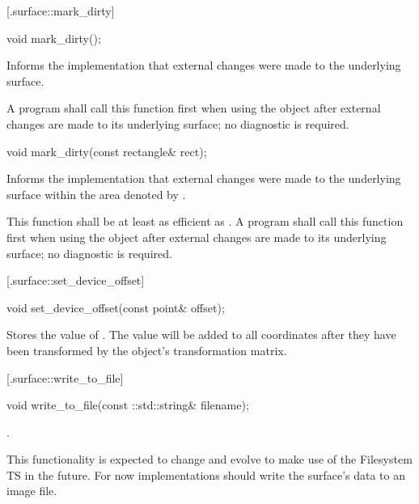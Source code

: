  [\iotwod.surface::mark_dirty] {}

%
%
\begin{itemdecl}
void mark_dirty();
\end{itemdecl}
\begin{itemdescr}
	\pnum
	\effects
	Informs the implementation that external changes were made to the underlying surface.
	
	\pnum
	\remarks
	A program shall call this function first when using the  object after external changes are made to its underlying surface; no diagnostic is required.
\end{itemdescr}

\begin{itemdecl}
void mark_dirty(const rectangle& rect);
\end{itemdecl}
\begin{itemdescr}
	\pnum
	\effects
	Informs the implementation that external changes were made to the underlying surface within the area denoted by .
	
	\pnum
	\remarks
	This function shall be at least as efficient as . A program shall call this function first when using the  object after external changes are made to its underlying surface; no diagnostic is required.
\end{itemdescr}

 [\iotwod.surface::set_device_offset] {}

%
%
\begin{itemdecl}
void set_device_offset(const point& offset);
\end{itemdecl}
\begin{itemdescr}
	\pnum
	\effects
	Stores the value of . The value will be added to all coordinates after they have been transformed by the  object's transformation matrix.
\end{itemdescr}

 [\iotwod.surface::write_to_file] {}

%
%
\begin{itemdecl}
void write_to_file(const ::std::string& filename);
\end{itemdecl}
\begin{itemdescr}
	\pnum
	\effects
	.
	
	\pnum
	\realnotes
	This functionality is expected to change and evolve to make use of the Filesystem TS in the future. For now implementations should write the surface's data to an image file.
\end{itemdescr}

